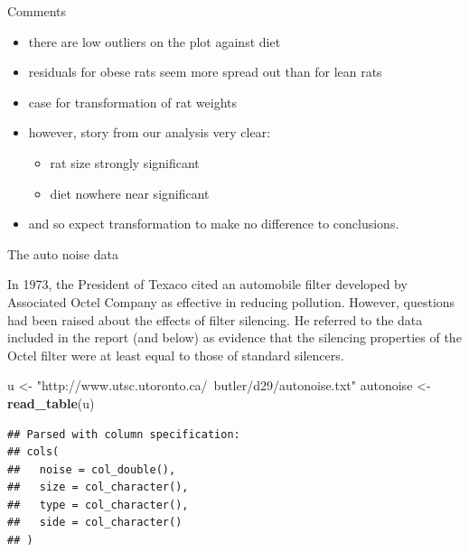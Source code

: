 \documentclass[
  ignorenonframetext,
]{beamer}
\newenvironment{Shaded}{\begin{snugshade}}{\end{snugshade}}
\newcommand{\KeywordTok}[1]{\textcolor[rgb]{0.13,0.29,0.53}{\textbf{#1}}}
\newcommand{\NormalTok}[1]{#1}
\newcommand{\StringTok}[1]{\textcolor[rgb]{0.31,0.60,0.02}{#1}}
\providecommand{\tightlist}{%
  \setlength{\itemsep}{0pt}\setlength{\parskip}{0pt}}
\begin{document}
\begin{frame}{Comments}
\protect\hypertarget{comments-18}{}

\begin{itemize}
\tightlist
\item
  there are low outliers on the plot against diet
\item
  residuals for obese rats seem more spread out than for lean rats
\item
  case for transformation of rat weights
\item
  however, story from our analysis very clear:

  \begin{itemize}
  \tightlist
  \item
    rat size strongly significant
  \item
    diet nowhere near significant
  \end{itemize}
\item
  and so expect transformation to make no difference to conclusions.
\end{itemize}

\end{frame}

\begin{frame}[fragile]{The auto noise data}
\protect\hypertarget{the-auto-noise-data}{}

In 1973, the President of Texaco cited an automobile filter developed by
Associated Octel Company as effective in reducing pollution. However,
questions had been raised about the effects of filter silencing. He
referred to the data included in the report (and below) as evidence that
the silencing properties of the Octel filter were at least equal to
those of standard silencers.

\begin{Shaded}
\begin{Highlighting}[]
\NormalTok{u <-}\StringTok{ "http://www.utsc.utoronto.ca/~butler/d29/autonoise.txt"}
\NormalTok{autonoise <-}\StringTok{ }\KeywordTok{read_table}\NormalTok{(u)}
\end{Highlighting}
\end{Shaded}

\begin{verbatim}
## Parsed with column specification:
## cols(
##   noise = col_double(),
##   size = col_character(),
##   type = col_character(),
##   side = col_character()
## )
\end{verbatim}

\end{frame}
\end{document}

